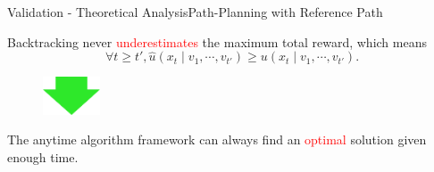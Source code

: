 \begin{frame}{Validation - Theoretical Analysis}{Path-Planning with Reference Path}

\begin{lemma}
Backtracking never \textcolor{red}{underestimates}
the maximum total reward, which means
\begin{equation}
\nonumber
\forall t \geq t', \hat{u}(x_{t} \mid v_{1} , \cdots , v_{t'}) \geq u(x_{t} \mid v_{1} , \cdots , v_{t'}).
\end{equation}
\end{lemma}

\begin{minipage}{\textwidth}
\begin{figure}
\centering
\includegraphics[width = 0.15\textwidth]{./figure/arrow}
\end{figure}
\end{minipage}

\begin{theorem}
The anytime algorithm framework can always find an \textcolor{red}{optimal} solution given enough time.
\end{theorem}

\end{frame}

